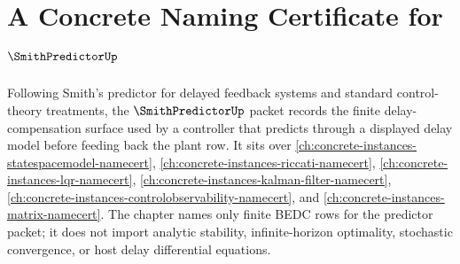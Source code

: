 \chapter{A Concrete Naming Certificate for $\SmithPredictorUp$}
\label{ch:concrete-instances-smith-predictor-namecert}

Following Smith's predictor for delayed feedback systems and standard control-theory treatments, the $\SmithPredictorUp$ packet records the finite delay-compensation surface used by a controller that predicts through a displayed delay model before feeding back the plant row. It sits over \autoref{ch:concrete-instances-statespacemodel-namecert}, \autoref{ch:concrete-instances-riccati-namecert}, \autoref{ch:concrete-instances-lqr-namecert}, \autoref{ch:concrete-instances-kalman-filter-namecert}, \autoref{ch:concrete-instances-controlobservability-namecert}, and \autoref{ch:concrete-instances-matrix-namecert}. The chapter names only finite BEDC rows for the predictor packet; it does not import analytic stability, infinite-horizon optimality, stochastic convergence, or host delay differential equations.

